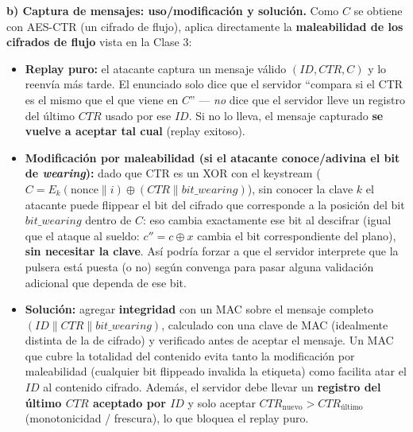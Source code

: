 \textbf{b) Captura de mensajes: uso/modificación y solución.}
Como $C$ se obtiene con AES-CTR (un cifrado de flujo), aplica directamente la
\textbf{maleabilidad de los cifrados de flujo} vista en la Clase 3:
\begin{itemize}
  \item \textbf{Replay puro:} el atacante captura un mensaje válido $(ID, CTR, C)$ y
  lo reenvía más tarde. El enunciado solo dice que el servidor ``compara si el CTR
  es el mismo que el que viene en $C$'' --- \emph{no} dice que el servidor lleve un
  registro del último $CTR$ usado por ese $ID$. Si no lo lleva, el mensaje capturado
  \textbf{se vuelve a aceptar tal cual} (replay exitoso).
  \item \textbf{Modificación por maleabilidad (si el atacante conoce/adivina el bit
  de \emph{wearing}):} dado que CTR es un XOR con el keystream
  ($C = E_k(\text{nonce}\|i) \oplus (CTR\|\mathit{bit\_wearing})$), sin conocer la
  clave $k$ el atacante puede flippear el bit del cifrado que corresponde a la
  posición del bit $\mathit{bit\_wearing}$ dentro de $C$: eso cambia exactamente ese
  bit al descifrar (igual que el ataque al sueldo: $c'' = c\oplus x$ cambia el bit
  correspondiente del plano), \textbf{sin necesitar la clave}. Así podría forzar
  a que el servidor interprete que la pulsera está puesta (o no) según convenga
  para pasar alguna validación adicional que dependa de ese bit.
  \item \textbf{Solución:} agregar \textbf{integridad} con un MAC sobre el mensaje
  completo $(ID\|CTR\|\mathit{bit\_wearing})$, calculado con una clave de MAC
  (idealmente distinta de la de cifrado) y verificado antes de aceptar el mensaje.
  Un MAC que cubre la totalidad del contenido evita tanto la modificación por
  maleabilidad (cualquier bit flippeado invalida la etiqueta) como facilita atar el
  $ID$ al contenido cifrado. Además, el servidor debe llevar un \textbf{registro del
  último $CTR$ aceptado por $ID$} y solo aceptar $CTR_{\text{nuevo}} > CTR_{\text{último}}$
  (monotonicidad / frescura), lo que bloquea el replay puro.
\end{itemize}

